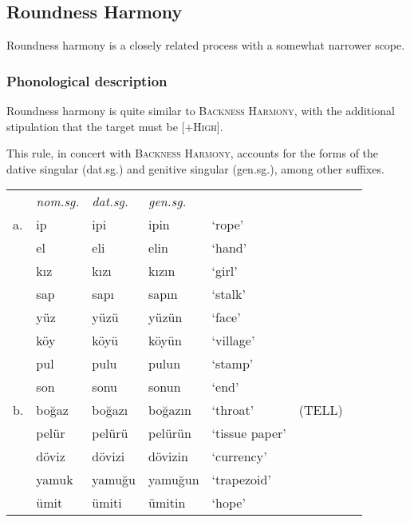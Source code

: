 \subsection{Roundness Harmony}

Roundness harmony is a closely related process with a somewhat narrower scope. 

\subsubsection{Phonological description}

Roundness harmony is quite similar to \textsc{Backness Harmony}, with the additional stipulation that the target must be [$+$\textsc{High}]. 


This rule, in concert with \textsc{Backness Harmony}, accounts for the forms of the dative singular (dat.sg.) and genitive singular (gen.sg.), among other suffixes.

\begin{example}
\begin{tabular}{l l l l l l@{ }l}
   & \emph{nom.sg.} & \emph{dat.sg.} & \emph{gen.sg.}  \\
a. & {ip}           & {ipi}          & {ipin}         & `rope' & \citep[][216]{Clements1982} \\
   & {el}           & {eli}          & {elin}         & `hand'    \\
   & {kız}          & {kızı}         & {kızın}        & `girl'    \\
   & {sap}          & {sapı}         & {sapın}        & `stalk'   \\
   & {yüz}          & {yüzü}         & {yüzün}        & `face'    \\
   & {köy}          & {köyü}         & {köyün}        & `village' \\
   & {pul}          & {pulu}         & {pulun}        & `stamp'   \\
   & {son}          & {sonu}         & {sonun}        & `end'     \\
b. & {boğaz}        & {boğazı}       & {boğazın}      & `throat'  & (TELL) \\
   & {pelür}        & {pelürü}       & {pelürün}      & `tissue paper' \\
   & {döviz}        & {dövizi}       & {dövizin}      & `currency' \\
   & {yamuk}        & {yamuğu}       & {yamuğun}      & `trapezoid' \\
   & {ümit}         & {ümiti}        & {ümitin}       & `hope'     \\
\end{tabular}
\end{example}

